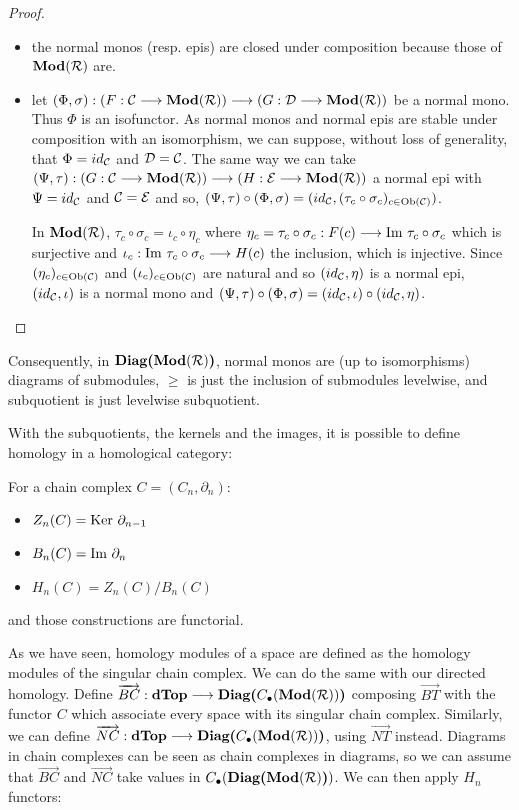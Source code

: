 \begin{proof}~
\begin{itemize}
	\item the normal monos (resp. epis) are closed under composition because those of $\textbf{Mod}(\mathcal{R})$ are.
	\item let $(\Phi,\sigma) : (F : \mathcal{C} \longrightarrow \textbf{Mod}(\mathcal{R})) \longrightarrow (G : \mathcal{D} \longrightarrow \textbf{Mod}(\mathcal{R}))$ be a normal mono. Thus $\Phi$ is an isofunctor. As normal monos and normal epis are stable under composition with an isomorphism, we can suppose, without loss of generality, that $\Phi = id_{\mathcal{C}}$ and $\mathcal{D} = \mathcal{C}$. The same way we can take $(\Psi,\tau) : (G : \mathcal{C} \longrightarrow \textbf{Mod}(\mathcal{R})) \longrightarrow (H : \mathcal{E} \longrightarrow \textbf{Mod}(\mathcal{R}))$ a normal epi with $\Psi = id_{\mathcal{C}}$ and $\mathcal{C} = \mathcal{E}$ and so, $(\Psi,\tau)\circ(\Phi,\sigma) = (id_{\mathcal{C}},(\tau_c\circ\sigma_c)_{c\in\text{Ob}(\mathcal{C})})$.
	
	In $\textbf{Mod}(\mathcal{R})$, $\tau_c\circ\sigma_c = \iota_c\circ\eta_c$ where $\eta_c = \tau_c\circ\sigma_c : F(c) \longrightarrow \text{Im }\tau_c\circ\sigma_c$ which is surjective and $\iota_c : \text{Im }\tau_c\circ\sigma_c \longrightarrow H(c)$ the inclusion, which is injective. Since $(\eta_c)_{c\in\text{Ob}(\mathcal{C})}$ and $(\iota_c)_{c\in\text{Ob}(\mathcal{C})}$ are natural and so $(id_{\mathcal{C}},\eta)$ is a normal epi, $(id_{\mathcal{C}},\iota)$ is a normal mono and $(\Psi,\tau)\circ(\Phi,\sigma) = (id_{\mathcal{C}},\iota)\circ(id_{\mathcal{C}},\eta)$.
\end{itemize}
\end{proof}

Consequently, in $\textbf{Diag(}\textbf{Mod}(\mathcal{R})\textbf{)}$, normal monos are (up to isomorphisms) diagrams of submodules, $\geq$ is just the inclusion of submodules levelwise, and subquotient is just levelwise subquotient.

With the subquotients, the kernels and the images, it is possible to define homology in a homological category:

\begin{defi}
For a chain complex $C = (C_n, \partial_n)$:
\begin{itemize}
	\item $Z_n(C) = \text{Ker }\partial_{n-1}$
	\item $B_n(C) =  \text{Im }\partial_n$
	\item $H_n(C) = Z_n(C)/B_n(C)$
\end{itemize}
and those constructions are functorial.
\end{defi}

As we have seen, homology modules of a space are defined as the homology modules of the singular chain complex. We can do the same with our directed homology. Define $\overrightarrow{BC} : \textbf{dTop} \longrightarrow \textbf{Diag(}C_{\bullet}(\textbf{Mod}(\mathcal{R}))\textbf{)}$ composing $\overrightarrow{BT}$ with the functor $C$ which associate every space with its singular chain complex. Similarly, we can define $\overrightarrow{NC} : \textbf{dTop} \longrightarrow \textbf{Diag(}C_{\bullet}(\textbf{Mod}(\mathcal{R}))\textbf{)}$, using $\overrightarrow{NT}$ instead. Diagrams in chain complexes can be seen as chain complexes in diagrams, so we can assume that $\overrightarrow{BC}$ and $\overrightarrow{NC}$ take values in $C_{\bullet}(\textbf{Diag(}\textbf{Mod}(\mathcal{R})\textbf{)})$. We can then apply $H_n$ functors:

